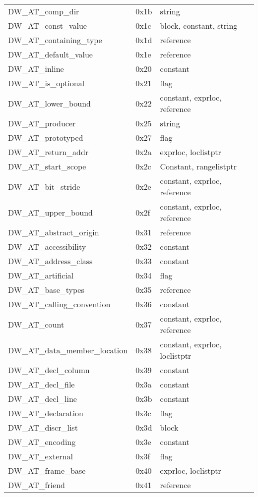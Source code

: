 \begin{centering}
\begin{longtable}{l|l|l}
DW\_AT\_comp\_dir&0x1b&string   \\
DW\_AT\_const\_value&0x1c&block, constant, string   \\
DW\_AT\_containing\_type&0x1d&reference     \\
DW\_AT\_default\_value&0x1e&reference     \\
DW\_AT\_inline&0x20&constant     \\
DW\_AT\_is\_optional&0x21&flag     \\
DW\_AT\_lower\_bound&0x22&constant, exprloc, reference     \\
DW\_AT\_producer&0x25&string     \\
DW\_AT\_prototyped&0x27&flag     \\
DW\_AT\_return\_addr&0x2a&exprloc, loclistptr     \\
DW\_AT\_start\_scope&0x2c&Constant, rangelistptr     \\
DW\_AT\_bit\_stride&0x2e&constant, exprloc, reference     \\
DW\_AT\_upper\_bound&0x2f&constant, exprloc, reference     \\
DW\_AT\_abstract\_origin&0x31&reference     \\
DW\_AT\_accessibility&0x32&constant     \\
DW\_AT\_address\_class&0x33&constant     \\
DW\_AT\_artificial&0x34&flag     \\
DW\_AT\_base\_types&0x35&reference     \\
DW\_AT\_calling\_convention&0x36&constant     \\
DW\_AT\_count&0x37&constant, exprloc, reference     \\
DW\_AT\_data\_member\_location&0x38&constant, exprloc, loclistptr     \\
DW\_AT\_decl\_column&0x39&constant     \\
DW\_AT\_decl\_file&0x3a&constant     \\
DW\_AT\_decl\_line&0x3b&constant     \\
DW\_AT\_declaration&0x3c&flag     \\
DW\_AT\_discr\_list&0x3d&block     \\
DW\_AT\_encoding&0x3e&constant     \\
DW\_AT\_external&0x3f&flag     \\
DW\_AT\_frame\_base&0x40&exprloc, loclistptr     \\
DW\_AT\_friend&0x41&reference     \\

\end{longtable}
\end{centering}
